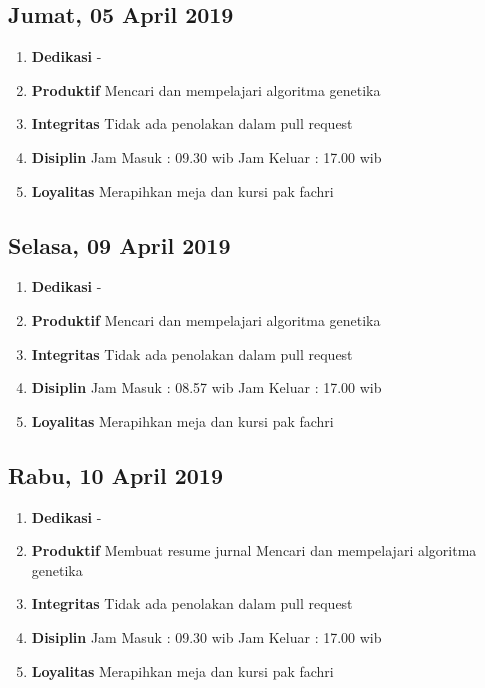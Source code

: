 \subsection{Jumat, 05 April 2019}
\begin{enumerate}
\item \textbf{Dedikasi}
\subitem -
\item \textbf{Produktif}
\subitem Mencari dan mempelajari algoritma genetika
\item \textbf{Integritas}
\subitem Tidak ada penolakan dalam pull request
\item \textbf{Disiplin}
\subitem Jam Masuk : 09.30 wib
\subitem Jam Keluar : 17.00 wib
\item \textbf{Loyalitas}
\subitem Merapihkan meja dan kursi pak fachri
\end{enumerate}

\subsection{Selasa, 09 April 2019}
\begin{enumerate}
\item \textbf{Dedikasi}
\subitem -
\item \textbf{Produktif}
\subitem Mencari dan mempelajari algoritma genetika
\item \textbf{Integritas}
\subitem Tidak ada penolakan dalam pull request
\item \textbf{Disiplin}
\subitem Jam Masuk : 08.57 wib
\subitem Jam Keluar : 17.00 wib
\item \textbf{Loyalitas}
\subitem Merapihkan meja dan kursi pak fachri
\end{enumerate}

\subsection{Rabu, 10 April 2019}
\begin{enumerate}
\item \textbf{Dedikasi}
\subitem -
\item \textbf{Produktif}
\subitem Membuat resume jurnal
\subitem Mencari dan mempelajari algoritma genetika
\item \textbf{Integritas}
\subitem Tidak ada penolakan dalam pull request
\item \textbf{Disiplin}
\subitem Jam Masuk : 09.30 wib
\subitem Jam Keluar : 17.00 wib
\item \textbf{Loyalitas}
\subitem Merapihkan meja dan kursi pak fachri
\end{enumerate}

